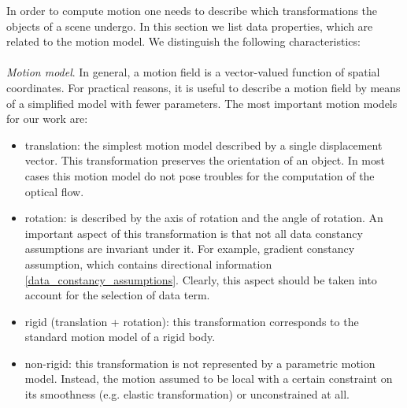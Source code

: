 In order to compute motion one needs to describe which transformations the objects of a scene undergo. In this section we list data properties, which are related to the motion model. We distinguish the following characteristics:
\\
\\
\textit{Motion model}. In general, a motion field is a vector-valued function of spatial coordinates. For practical reasons, it is useful to describe a motion field by means of a simplified model with fewer parameters. The most important motion models for our work are:
\begin{itemize}
	\item translation: the simplest motion model described by a single displacement vector. This transformation preserves the orientation of an object. In most cases this motion model do not pose troubles for the computation of the optical flow.
	\item rotation: is described by the axis of rotation and the angle of rotation. An important aspect of this transformation is that not all data constancy assumptions are invariant under it. For example, gradient constancy assumption, which contains directional information \ref{data_constancy_assumptions}. Clearly, this aspect should be taken into account for the selection of data term.
	\item rigid (translation + rotation): this transformation corresponds to the standard motion model of a rigid body. 
	\item non-rigid: this transformation is not represented by a parametric motion model. Instead, the motion assumed to be local with a certain constraint on its  smoothness (e.g. elastic transformation) or unconstrained at all. 
\end{itemize}


%	

